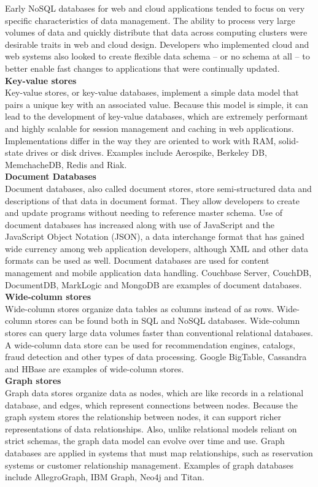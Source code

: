 Early NoSQL databases for web and cloud applications tended to focus on very specific characteristics of data management. The ability to process very large volumes of data and quickly distribute that data  across computing clusters were desirable traits in web and cloud design. Developers who implemented cloud and web systems also looked to create flexible data schema -- or no schema at all -- to better enable fast changes to applications that were continually updated.\\
\textbf{Key-value stores}\\
Key-value stores, or key-value databases, implement a simple data model that pairs a unique key with an associated value. Because this model is simple, it can lead to the development of key-value databases, which are extremely performant and highly scalable for session management and caching in web applications. Implementations differ in the way they are oriented to work with RAM, solid-state drives or disk drives. Examples include Aerospike, Berkeley DB, MemchacheDB, Redis and Riak.\\
\textbf{Document Databases}\\
Document databases, also called document stores, store semi-structured data and descriptions of that data in document format. They allow developers to create and update programs without needing to reference master schema. Use of document databases has increased along with use of JavaScript and the JavaScript Object Notation (JSON), a data interchange format that has gained wide currency among web application developers, although XML and other data formats can be used as well.  Document databases are used for content management and mobile application data handling. Couchbase Server, CouchDB, DocumentDB, MarkLogic and MongoDB are examples of document databases.\\
\textbf{Wide-column stores}\\
Wide-column stores organize data tables as columns instead of as rows. Wide-column stores can be found both in SQL and NoSQL databases. Wide-column stores can query large data volumes faster than conventional relational databases. A wide-column data store can be used for recommendation engines, catalogs, fraud detection and other types of data processing.  Google BigTable, Cassandra and HBase are examples of wide-column stores.\\
\textbf{Graph stores}\\
Graph data stores organize data as nodes, which are like records in a relational database, and edges, which represent connections between nodes. Because the graph system stores the relationship between nodes, it can support richer representations of data relationships. Also, unlike relational models reliant on strict schemas, the graph data model can evolve over time and use. Graph databases are applied in systems that must map relationships, such as reservation systems or customer relationship management. Examples of graph databases include AllegroGraph, IBM Graph, Neo4j and Titan.\\
